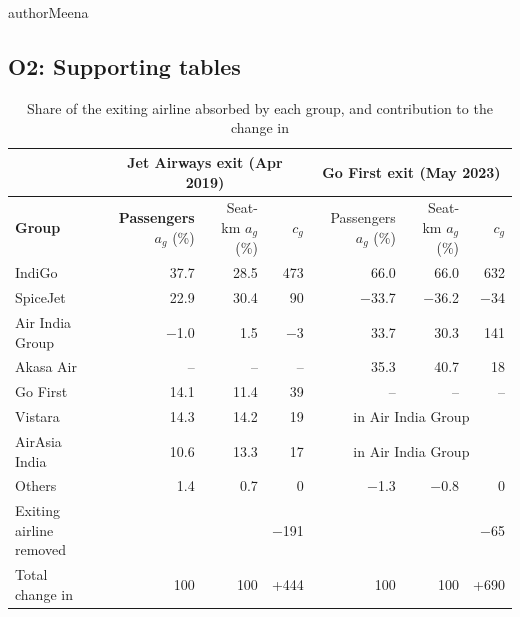 \begin{authorcontribution}{authorMeena}
\clearpage
\subsection*{O2: Supporting tables}
\begin{table}[H]
\centering
{}
\color{authorMeena}
\caption{Share of the exiting airline absorbed by each group, and contribution to the change in \HHI{}}\label{tab:o2-absorption}
\small
\begin{tabular}{|l|r|r|r|r|r|r|}
\hline
 & \multicolumn{3}{c|}{Jet Airways exit (Apr 2019)} & \multicolumn{3}{c|}{Go First exit (May 2023)} \\
\hline
\textbf{Group} & \shortstack{\textbf{Passengers}\\$a_g$ (\%)} & \shortstack{Seat-km\\$a_g$ (\%)} & $c_g$ & \shortstack{Passengers\\$a_g$ (\%)} & \shortstack{Seat-km\\$a_g$ (\%)} & $c_g$ \\
\hline
IndiGo & 37.7 & 28.5 & 473 & 66.0 & 66.0 & 632 \\
\hline
SpiceJet & 22.9 & 30.4 & 90 & $-$33.7 & $-$36.2 & $-$34 \\
\hline
Air India Group & $-$1.0 & 1.5 & $-$3 & 33.7 & 30.3 & 141 \\
\hline
Akasa Air & -- & -- & -- & 35.3 & 40.7 & 18 \\
\hline
Go First & 14.1 & 11.4 & 39 & -- & -- & -- \\
\hline
Vistara & 14.3 & 14.2 & 19 & \multicolumn{3}{c|}{in Air India Group} \\
\hline
AirAsia India & 10.6 & 13.3 & 17 & \multicolumn{3}{c|}{in Air India Group} \\
\hline
Others & 1.4 & 0.7 & 0 & $-$1.3 & $-$0.8 & 0 \\
\hline
Exiting airline removed & & & $-$191 & & & $-$65 \\
\hline
Total change in \HHI{} & 100 & 100 & +444 & 100 & 100 & +690 \\
\hline
\end{tabular}
\end{table}


\end{authorcontribution}

